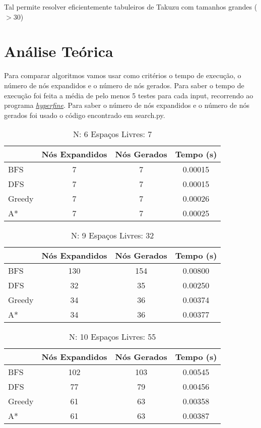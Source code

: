 \documentclass[12pt,a4paper]{article}
\begin{document}
  Tal permite resolver eficientemente tabuleiros de Takuzu com tamanhos grandes ($> 30$)
  

  \section{Análise Teórica}

  Para comparar algoritmos vamos usar como critérios o tempo de execução, o número de nós expandidos e o número de nós gerados.
  Para saber o tempo de execução foi feita a média de pelo menos 5 testes para cada input, recorrendo ao programa \href{https://github.com/sharkdp/hyperfine}{\textit{hyperfine}}.
  Para saber o número de nós expandidos e o número de nós gerados foi usado o código encontrado em search.py.

  \begin{table}[H]
    \caption{N: 6 Espaços Livres: 7}
    \label{tab:my-table}
    \centering
    \begin{tabular}{lccc}
      & Nós Expandidos & Nós Gerados & Tempo (s) \\
      \hline
      BFS    &  7 &  7 & 0.00015 \\
      DFS    &  7 &  7 & 0.00015 \\
      Greedy &  7 &  7 & 0.00026 \\
      A*     &  7 &  7 & 0.00025 \\
    \hline
    \end{tabular}
  \end{table}

  \begin{table}[H]
    \caption{N: 9 Espaços Livres: 32}
    \label{tab:my-table1}
    \centering
    \begin{tabular}{lccc}
      & Nós Expandidos & Nós Gerados & Tempo (s) \\
      \hline
      BFS     & 130 & 154 & 0.00800 \\
      DFS     &  32 &  35 & 0.00250 \\
      Greedy  &  34 &  36 & 0.00374 \\
      A*      &  34 &  36 & 0.00377 \\
    \hline
    \end{tabular}
  \end{table}

  \begin{table}[H]
    \caption{N: 10 Espaços Livres: 55}
    \label{tab:my-table2}
    \centering
    \begin{tabular}{lccc}
      & Nós Expandidos & Nós Gerados & Tempo (s) \\
      \hline
      BFS    & 102 & 103  & 0.00545 \\
      DFS    &  77 &  79  & 0.00456 \\
      Greedy &  61 &  63  & 0.00358 \\
      A*     &  61 &  63  & 0.00387 \\
    \hline
    \end{tabular}
  \end{table}
\end{document}
